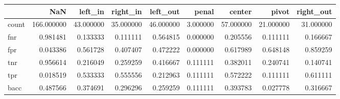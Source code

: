 \begin{tabular}{lrrrrrrrr}
\toprule
{} &         NaN &    left\_in &   right\_in &   left\_out &     penal &     center &      pivot &  right\_out \\
\midrule
count &  166.000000 &  43.000000 &  35.000000 &  46.000000 &  3.000000 &  57.000000 &  21.000000 &  31.000000 \\
fnr   &    0.981481 &   0.133333 &   0.111111 &   0.564815 &  0.000000 &   0.205556 &   0.111111 &   0.166667 \\
fpr   &    0.043386 &   0.561728 &   0.407407 &   0.472222 &  0.000000 &   0.617989 &   0.648148 &   0.859259 \\
tnr   &    0.956614 &   0.216049 &   0.259259 &   0.416667 &  0.111111 &   0.382011 &   0.240741 &   0.140741 \\
tpr   &    0.018519 &   0.533333 &   0.555556 &   0.212963 &  0.111111 &   0.572222 &   0.111111 &   0.611111 \\
bacc  &    0.487566 &   0.374691 &   0.296296 &   0.259259 &  0.111111 &   0.393783 &   0.027778 &   0.316667 \\
\bottomrule
\end{tabular}
